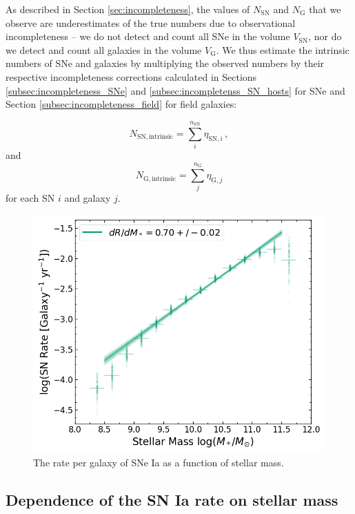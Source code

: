 \documentclass[fleqn,usenatbib]{mnras}
\begin{document}
As described in Section \ref{sec:incompleteness}, the values of $N_{\mathrm{SN}}$ and $N_{\mathrm{G}}$ that we observe are underestimates of the true numbers due to observational incompleteness -- we do not detect and count all SNe in the volume $V_{\mathrm{SN}}$, nor do we detect and count all galaxies in the volume $V_{\mathrm{G}}$. We thus estimate the intrinsic numbers of SNe and galaxies by multiplying the observed numbers by their respective incompleteness corrections calculated in Sections \ref{subsec:incompleteness_SNe} and \ref{subsec:incompletenss_SN_hosts} for SNe and Section \ref{subsec:incompleteness_field} for field galaxies:

\begin{equation}
    N_{\mathrm{SN,intrinsic}} = \sum_i^{n_{\mathrm{SN}}}\eta_{\mathrm{SN,}i}\,,
    \label{eq:corr_SN}
\end{equation}
and
\begin{equation}
    N_{\mathrm{G,intrinsic}} = \sum_j^{n_{\mathrm{G}}} \eta_{\mathrm{G,}j} 
    \label{eq:corr_G}
\end{equation}
for each SN $i$ and galaxy $j$.

\begin{figure}
    \centering
    \includegraphics[width=.5\textwidth]{figs/rate_vs_mass_all.png}
    \caption{The rate per galaxy of SNe Ia as a function of stellar mass.}%
    \label{fig:rate_raw}
\end{figure}

\subsection{Dependence of the SN Ia rate on stellar mass \label{subsec:rates_mass}}
\end{document}
